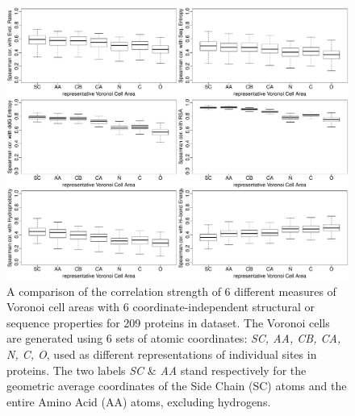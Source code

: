 \documentclass[11pt]{article}
\begin{document}
    \begin{figure}[tbh]
        \begin{center}
        \includegraphics[width=6.9in]{best_varea/select_variables/boxplot_varea_all_in_one.pdf}
        \end{center}
        \caption{A comparison of the correlation strength of 6 different measures of Voronoi cell areas with 6 coordinate-independent structural or sequence properties for 209 proteins in dataset.  The Voronoi cells are generated using 6 sets of atomic coordinates: {\it SC, AA, CB, CA, N, C, O}, used as different representations of individual sites in proteins. The two labels {\it SC} \& {\it AA} stand respectively for the geometric average coordinates of the Side Chain (SC) atoms and the entire Amino Acid (AA) atoms, excluding hydrogens.}
        \label{fig:best_voronoi}
    \end{figure}
\end{document}
